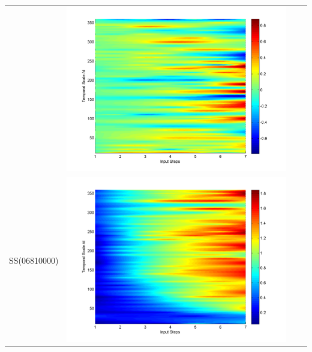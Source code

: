 \documentclass[11pt]{article}
\begin{document}
\begin{table}[H]
{\begin{tabular}{cccc}
&\begin{minipage}{.3\textwidth}\includegraphics[width=\linewidth]{resultgraph/11532500diff_q.png}\end{minipage}
\\
SS(06810000)
&\begin{minipage}{.3\textwidth}\includegraphics[width=\linewidth]{resultgraph/06810000p.png}\end{minipage}

\end{tabular}}
\end{table}
\end{document}
